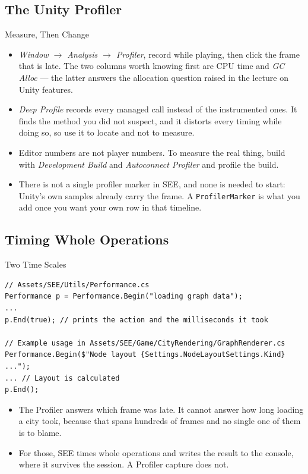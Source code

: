 \subsection{The Unity Profiler}

\begin{frame}{Measure, Then Change}
  \begin{itemize}
    \item \emph{Window $\rightarrow$ Analysis $\rightarrow$ Profiler}, record
      while playing, then click the frame that is late. The two columns worth
      knowing first are CPU time and \emph{GC Alloc} --- the latter answers
      the allocation question raised in the lecture on Unity features.
    \item \emph{Deep Profile} records every managed call instead of the
      instrumented ones. It finds the method you did not suspect, and it
      distorts every timing while doing so, so use it to locate and not to
      measure.
    \item Editor numbers are not player numbers. To measure the real thing,
      build with \emph{Development Build} and \emph{Autoconnect Profiler} and
      profile the build.
    \item There is not a single profiler marker in SEE, and none is needed to
      start: Unity's own samples already carry the frame. A
      \texttt{ProfilerMarker} is what you add once you want your own row in
      that timeline.
  \end{itemize}
\end{frame}

\subsection{Timing Whole Operations}

\begin{frame}[fragile]{Two Time Scales}
  \begin{lstlisting}[basicstyle=\scriptsize\ttfamily]
// Assets/SEE/Utils/Performance.cs
Performance p = Performance.Begin("loading graph data");
...
p.End(true); // prints the action and the milliseconds it took

// Example usage in Assets/SEE/Game/CityRendering/GraphRenderer.cs
Performance.Begin($"Node layout {Settings.NodeLayoutSettings.Kind} ...");
... // Layout is calculated
p.End();
  \end{lstlisting}
  \vspace{1ex}

  \begin{itemize}
    \item The Profiler answers which frame was late. It cannot answer how long
      loading a city took, because that spans hundreds of frames and no single
      one of them is to blame.
    \item For those, SEE times whole operations and writes the result to the
      console, where it survives the session. A Profiler capture does not.
  \end{itemize}
  \vspace{1ex}

\end{frame}

